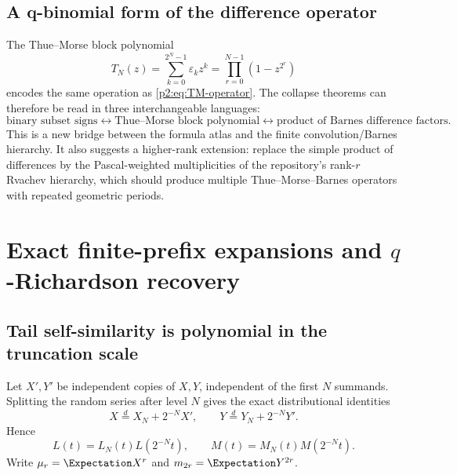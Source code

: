 \documentclass[11pt,oneside]{article}
\numberwithin{equation}{section}
\theoremstyle{definition}
\theoremstyle{remark}
\newcommand{\eps}{\varepsilon}
\begin{document}
\subsection{A q-binomial form of the difference operator}

The Thue--Morse block polynomial
\begin{equation}
 T_N(z)=\sum_{k=0}^{2^N-1}\eps_kz^k
 =\prod_{r=0}^{N-1}(1-z^{2^r})
 \label{p2:eq:TN}
\end{equation}
encodes the same operation as \eqref{p2:eq:TM-operator}.  The collapse theorems can therefore be read
in three interchangeable languages:
\begin{equation}
 \text{binary subset signs}
 \longleftrightarrow
 \text{Thue--Morse block polynomial}
 \longleftrightarrow
 \text{product of Barnes difference factors}.
 \label{p2:eq:three-languages}
\end{equation}
This is a new bridge between the formula atlas and the finite convolution/Barnes hierarchy.  It also
suggests a higher-rank extension: replace the simple product of differences by the Pascal-weighted
multiplicities of the repository's rank-$r$ Rvachev hierarchy, which should produce multiple
Thue--Morse--Barnes operators with repeated geometric periods.

\section{Exact finite-prefix expansions and \texorpdfstring{$q$}{q}-Richardson recovery}
\label{p2:sec:richardson}

\subsection{Tail self-similarity is polynomial in the truncation scale}

Let $X',Y'$ be independent copies of $X,Y$, independent of the first $N$ summands.  Splitting the
random series after level $N$ gives the exact distributional identities
\begin{equation}
 X\overset{d}=X_N+2^{-N}X',
 \qquad
 Y\overset{d}=Y_N+2^{-N}Y'.
 \label{p2:eq:tail-self-similarity}
\end{equation}
Hence
\begin{equation}
 L(t)=L_N(t)L(2^{-N}t),
 \qquad
 M(t)=M_N(t)M(2^{-N}t).
 \label{p2:eq:finite-infinite-mgf}
\end{equation}
Write $\mu_r=\Expectation X^r$ and $m_{2r}=\Expectation Y^{2r}$.
\end{document}
